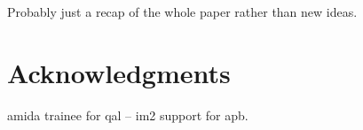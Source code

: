\documentclass[11pt]{article}
\begin{document}
Probably just a recap of the whole paper rather than new ideas.


\section*{Acknowledgments}

amida trainee for qal -- im2 support for apb.






\end{document}
